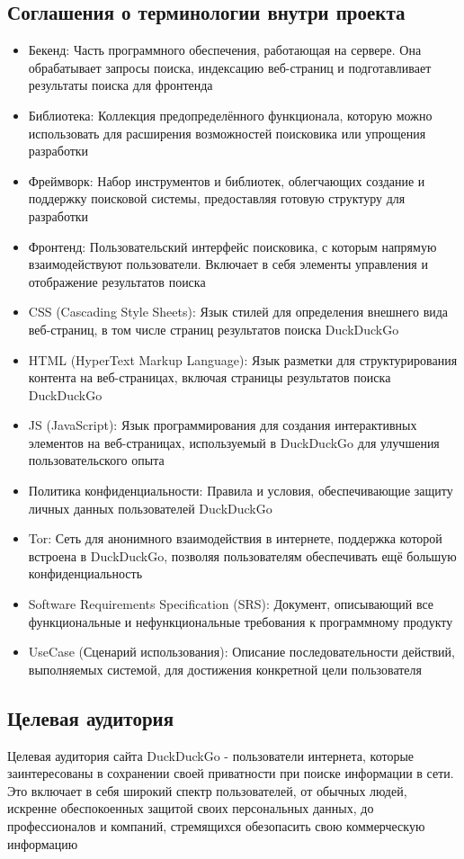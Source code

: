 \documentclass[12pt,a4paper]{article}
\begin{document}
\subsection{Соглашения о терминологии внутри проекта}
\begin{itemize}
    \item Бекенд: Часть программного обеспечения, работающая на сервере. Она обрабатывает запросы поиска, индексацию веб-страниц и подготавливает результаты поиска для фронтенда
    \item Библиотека: Коллекция предопределённого функционала, которую можно использовать для расширения возможностей поисковика или упрощения разработки
    \item Фреймворк: Набор инструментов и библиотек, облегчающих создание и поддержку поисковой системы, предоставляя готовую структуру для разработки
    \item Фронтенд: Пользовательский интерфейс поисковика, с которым напрямую взаимодействуют пользователи. Включает в себя элементы управления и отображение результатов поиска
    \item CSS (Cascading Style Sheets): Язык стилей для определения внешнего вида веб-страниц, в том числе страниц результатов поиска DuckDuckGo
    \item HTML (HyperText Markup Language): Язык разметки для структурирования контента на веб-страницах, включая страницы результатов поиска DuckDuckGo
    \item JS (JavaScript): Язык программирования для создания интерактивных элементов на веб-страницах, используемый в DuckDuckGo для улучшения пользовательского опыта
    \item Политика конфиденциальности: Правила и условия, обеспечивающие защиту личных данных пользователей DuckDuckGo
    \item Tor: Сеть для анонимного взаимодействия в интернете, поддержка которой встроена в DuckDuckGo, позволяя пользователям обеспечивать ещё большую конфиденциальность
    \item Software Requirements Specification (SRS): Документ, описывающий все функциональные и нефункциональные требования к программному продукту
    \item UseCase (Сценарий использования): Описание последовательности действий, выполняемых системой, для достижения конкретной цели пользователя

\end{itemize}
\subsection{Целевая аудитория}
Целевая аудитория сайта DuckDuckGo - пользователи интернета, которые заинтересованы в сохранении своей приватности при поиске информации в сети. Это включает в себя широкий спектр пользователей, от обычных людей, искренне обеспокоенных защитой своих персональных данных, до профессионалов и компаний, стремящихся обезопасить свою коммерческую информацию
\end{document}
